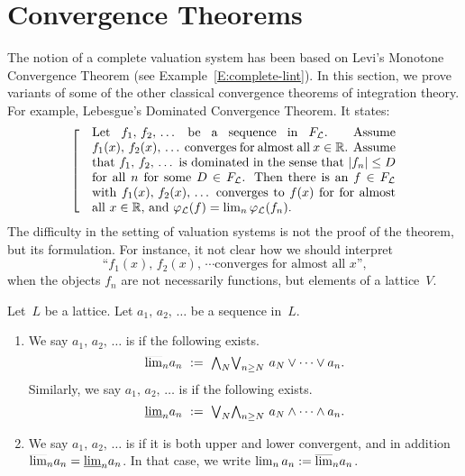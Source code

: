 \documentclass[main.tex]{subfiles}
\begin{document}
\section{Convergence Theorems}
\label{S:convergence-theorems}
The notion of a complete  valuation system
has been based on Levi's Monotone Convergence Theorem
(see Example~\ref{E:complete-lint}).
In this section,
we prove variants of some of the other classical convergence theorems
of integration theory.
For example, 
Lebesgue's Dominated Convergence Theorem.
It states:
\begin{equation*}
\left[\quad
\begin{minipage}{.7\columnwidth}
Let $f_1,\,f_2,\,\dotsc$ be a sequence in~$\LF$.

Assume $f_1(x),\,f_2(x),\,\dotsc$
converges for almost all~$x\in\R$.

Assume that $f_1,\,f_2,\,\dotsc$
 is dominated in the sense that
 $|f_n|\leq D$ for all~$n$
for some $D\in\LF$.

Then there is an $f\in\LF$
with $f_1(x),\,f_2(x),\,\dotsc$ converges to $f(x)$ for 
for almost all~$x\in\R$,
and $\Lphi(f) = \lim_n\Lphi(f_n)$.
\end{minipage}
\right.
\end{equation*} 
The difficulty 
in the setting of  valuation systems
is not the proof of the theorem,
but its formulation.
For instance, it 
not clear how we should interpret 
\begin{equation*}
\text{``$f_1(x),\,f_2(x),\,\dotsb$
converges for almost all~$x$'',}
\end{equation*}
when the objects $f_n$ are not necessarily functions,
but elements of a lattice~$V$.

%
%
\begin{dfn}
Let~$L$ be a lattice.
Let $a_1,\,a_2,\,\dotsc$ be a sequence in~$L$.
\begin{enumerate}
\item
We say $a_1,\,a_2,\,\dotsc$ 
is 
if the following exists.
\begin{equation*}
\ulim{n} a_n \ \eqdf\ \bw_N\bv_{n\geq N}\ a_N \vee \dotsb \vee a_n.
\end{equation*}
Similarly,
we say $a_1,\,a_2,\,\dotsc$ is 
if the following exists.
\begin{equation*}
\llim{n} a_n \ \eqdf\ \bv_N\bw_{n\geq N}\ a_N \wedge \dotsb \wedge a_n.
\end{equation*}

\item
We say $a_1,\,a_2,\,\dotsc$ is 
if it is both upper and lower convergent,
and in addition $\smash{\overline{\lim}_{n}}a_n = \smash{\underline{\lim}_{n}}a_n$.
In that case,
we write $\lim_n a_n:=\smash{\overline{\lim}_{n}} a_n$.
\end{enumerate}
\end{dfn}
\end{document}
